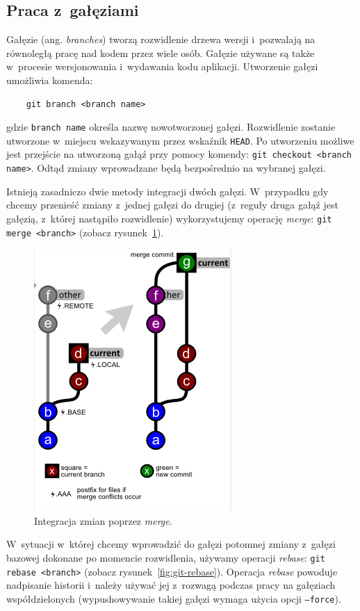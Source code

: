 \documentclass[12pt]{article}
\begin{document}
        \subsection*{Praca z~gałęziami}
        Gałęzie (ang. \textit{branches}) tworzą rozwidlenie drzewa wersji i~pozwalają na równoległą pracę nad kodem przez wiele osób. Gałęzie używane są także w~procesie wersjonowania i~wydawania kodu aplikacji. Utworzenie gałęzi umożliwia komenda:
        \begin{verbatim}
    git branch <branch name>
        \end{verbatim}
        gdzie \texttt{branch name} określa nazwę nowotworzonej gałęzi. Rozwidlenie zostanie utworzone w~miejscu wskazywanym przez wskaźnik \texttt{HEAD}. Po utworzeniu możliwe jest przejście na utworzoną gałąź przy pomocy komendy: \texttt{git checkout <branch name>}. Odtąd zmiany wprowadzane będą bezpośrednio na wybranej gałęzi.

        Istnieją zasadniczo dwie metody integracji dwóch gałęzi. W~przypadku gdy chcemy przenieść zmiany z~jednej gałęzi do drugiej (z~reguły druga gałąź jest gałęzią, z~której nastąpiło rozwidlenie) wykorzystujemy operację \textit{merge}: \texttt{git merge <branch>} (zobacz rysunek~\ref{fig:git-merge}).

        \begin{figure}[ht]
            \centering
            \includegraphics{git-merge}
            \caption{Integracja zmian poprzez \textit{merge}.}
            \label{fig:git-merge}
        \end{figure}

        W~sytuacji w~której chcemy wprowadzić do gałęzi potomnej zmiany z~gałęzi bazowej dokonane po momencie rozwidlenia, używamy operacji \textit{rebase}: \texttt{git rebase <branch>} (zobacz rysunek~\ref{fig:git-rebase}). Operacja \textit{rebase} powoduje nadpisanie historii i~należy używać jej z~rozwagą podczas pracy na gałęziach współdzielonych (wypushowywanie takiej gałęzi wymaga użycia opcji \texttt{--force}).
\end{document}
